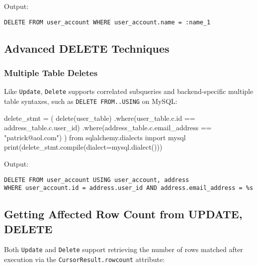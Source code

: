 \documentclass[
  letterpaper,
  DIV=11,
  numbers=noendperiod]{scrreprt}
\newenvironment{Shaded}{\begin{snugshade}}{\end{snugshade}}
\newcommand{\BuiltInTok}[1]{\textcolor[rgb]{0.00,0.23,0.31}{#1}}
\newcommand{\ImportTok}[1]{\textcolor[rgb]{0.00,0.46,0.62}{#1}}
\newcommand{\NormalTok}[1]{\textcolor[rgb]{0.00,0.23,0.31}{#1}}
\newcommand{\OperatorTok}[1]{\textcolor[rgb]{0.37,0.37,0.37}{#1}}
\newcommand{\StringTok}[1]{\textcolor[rgb]{0.13,0.47,0.30}{#1}}
\begin{document}
Output:

\begin{verbatim}
DELETE FROM user_account WHERE user_account.name = :name_1
\end{verbatim}

\subsection{Advanced DELETE
Techniques}\label{advanced-delete-techniques}

\subsubsection{Multiple Table Deletes}\label{multiple-table-deletes}

Like \texttt{Update}, \texttt{Delete} supports correlated subqueries and
backend-specific multiple table syntaxes, such as
\texttt{DELETE\ FROM..USING} on MySQL:

\begin{Shaded}
\begin{Highlighting}[]
\NormalTok{delete\_stmt }\OperatorTok{=}\NormalTok{ (}
\NormalTok{    delete(user\_table)}
\NormalTok{    .where(user\_table.c.}\BuiltInTok{id} \OperatorTok{==}\NormalTok{ address\_table.c.user\_id)}
\NormalTok{    .where(address\_table.c.email\_address }\OperatorTok{==} \StringTok{"patrick@aol.com"}\NormalTok{)}
\NormalTok{)}
\ImportTok{from}\NormalTok{ sqlalchemy.dialects }\ImportTok{import}\NormalTok{ mysql}
\BuiltInTok{print}\NormalTok{(delete\_stmt.}\BuiltInTok{compile}\NormalTok{(dialect}\OperatorTok{=}\NormalTok{mysql.dialect()))}
\end{Highlighting}
\end{Shaded}

Output:

\begin{verbatim}
DELETE FROM user_account USING user_account, address
WHERE user_account.id = address.user_id AND address.email_address = %s
\end{verbatim}

\subsection{Getting Affected Row Count from UPDATE,
DELETE}\label{getting-affected-row-count-from-update-delete}

Both \texttt{Update} and \texttt{Delete} support retrieving the number
of rows matched after execution via the \texttt{CursorResult.rowcount}
attribute:
\end{document}
